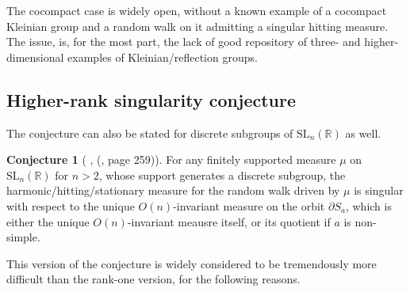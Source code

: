 \documentclass[11pt]{amsart}
\theoremstyle{definition}
\newtheorem{conjecture}{Conjecture}[section]
\begin{document}
	The cocompact case is widely open, without a known example of a cocompact Kleinian group and a random walk on it admitting a singular hitting measure. The issue, is, for the most part, the lack of good repository of three- and higher-dimensional examples of Kleinian/reflection groups.
	
	\subsection{Higher-rank singularity conjecture}
	
	The conjecture can also be stated for discrete subgroups of $\text{SL}_n(\mathbb{R})$ as well.
	
	\begin{conjecture}[ \cite{MR2568439}, (\cite{kaimanovich2011matrix}, page 259)]
		\label{Higher rank singularity conjecture}
		For any finitely supported measure $\mu$ on $\text{SL}_n(\mathbb{R})$ for $n > 2$, whose support generates a discrete subgroup, the harmonic/hitting/stationary measure for the random walk driven by $\mu$ is singular with respect to the unique $O(n)$-invariant measure on the orbit $\partial S_a$, which is either the unique $O(n)$-invariant meausre itself, or its quotient if $a$ is non-simple.
	\end{conjecture}
	
	This version of the conjecture is widely considered to be tremendously more difficult than the rank-one version, for the following reasons.
	
\end{document}
